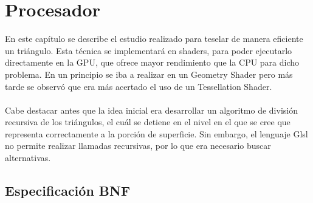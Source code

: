 
\chapter{Procesador}

En este capítulo se describe el estudio realizado para teselar de manera eficiente un triángulo. Esta técnica se implementará en shaders, para poder ejecutarlo directamente en la GPU, que ofrece mayor rendimiento que la CPU para dicho problema. En un principio se iba a realizar en un Geometry Shader pero más tarde se observó que era más acertado el uso de un Tessellation Shader. \\
\\ Cabe destacar antes que la idea inicial era desarrollar un algoritmo de división recursiva de los triángulos, el cuál se detiene en el nivel en el que se cree que representa correctamente a la porción de superficie. Sin embargo, el lenguaje Glsl no permite realizar llamadas recursivas, por lo que era necesario buscar alternativas.

\section{Especificación BNF}


